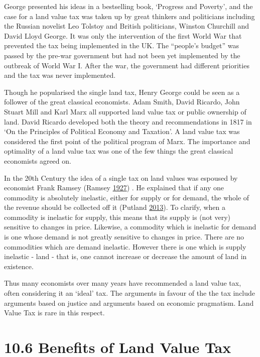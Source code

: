 \documentclass[]{tufte-handout}
\begin{document}
George presented his ideas in a bestselling book, `Progress and
Poverty', and the case for a land value tax was taken up by great
thinkers and politicians including the Russian novelist Leo Tolstoy and
British politicians, Winston Churchill and David Lloyd George. It was
only the intervention of the first World War that prevented the tax
being implemented in the UK. The ``people's budget'' was passed by the
pre-war government but had not been yet implemented by the outbreak of
World War I. After the war, the government had different priorities and
the tax was never implemented.

Though he popularised the single land tax, Henry George could be seen as
a follower of the great classical economists. Adam Smith, David Ricardo,
John Stuart Mill and Karl Marx all supported land value tax or public
ownership of land. David Ricardo developed both the theory and
recommendations in 1817 in `On the Principles of Political Economy and
Taxation'. A land value tax was considered the first point of the
political program of Marx. The importance and optimality of a land value
tax was one of the few things the great classical economists agreed on.

In the 20th Century the idea of a single tax on land values was espoused
by economist Frank Ramsey (Ramsey
\protect\hyperlink{ref-Ramsey1927}{1927}) . He explained that if any one
commodity is absolutely inelastic, either for supply or for demand, the
whole of the revenue should be collected off it (Putland
\protect\hyperlink{ref-Putland2013}{2013}). To clarify, when a commodity
is inelastic for supply, this means that its supply is (not very)
sensitive to changes in price. Likewise, a commodity which is inelastic
for demand is one whose demand is not greatly sensitive to changes in
price. There are no commodities which are demand inelastic. However
there is one which is supply inelastic - land - that is, one cannot
increase or decrease the amount of land in existence.

Thus many economists over many years have recommended a land value tax,
often considering it an `ideal' tax. The arguments in favour of the the
tax include arguments based on justice and arguments based on economic
pragmatism. Land Value Tax is rare in this respect.

\hypertarget{benefits-of-land-value-tax}{%
\section{10.6 Benefits of Land Value
Tax}\label{benefits-of-land-value-tax}}
\end{document}
